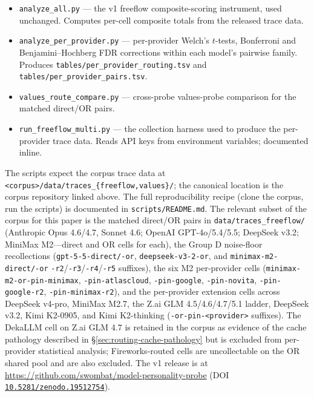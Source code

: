 \documentclass[11pt,a4paper]{article}
\begin{document}
\begin{itemize}[leftmargin=2em, itemsep=0.2em]
    \item \begin{sloppypar}\texttt{analyze\_all.py} --- the v1 freeflow composite-scoring instrument, used unchanged. Computes per-cell composite totals from the released trace data.\end{sloppypar}
    \item \begin{sloppypar}\texttt{analyze\_per\_provider.py} --- per-provider Welch's $t$-tests, Bonferroni and Benjamini--Hochberg FDR corrections within each model's pairwise family. Produces \texttt{tables/\allowbreak per\_provider\_routing.tsv} and \texttt{tables/\allowbreak per\_provider\_pairs.tsv}.\end{sloppypar}
    \item \begin{sloppypar}\texttt{values\_route\_compare.py} --- cross-probe values-probe comparison for the matched direct/OR pairs.\end{sloppypar}
    \item \begin{sloppypar}\texttt{run\_freeflow\_multi.py} --- the collection harness used to produce the per-provider trace data. Reads API keys from environment variables; documented inline.\end{sloppypar}
\end{itemize}

\begin{sloppypar}
\noindent The scripts expect the corpus trace data at \texttt{<corpus>/\allowbreak data/\allowbreak traces\_\{freeflow,values\}/}; the canonical location is the corpus repository linked above. The full reproducibility recipe (clone the corpus, run the scripts) is documented in \texttt{scripts/\allowbreak README.md}. The relevant subset of the corpus for this paper is the matched direct/OR pairs in \texttt{data/\allowbreak traces\_freeflow/} (Anthropic Opus 4.6/4.7, Sonnet 4.6; OpenAI GPT-4o/5.4/5.5; DeepSeek v3.2; MiniMax M2---direct and OR cells for each), the Group D noise-floor recollections (\texttt{gpt-5-5-\allowbreak direct/-or}, \texttt{deepseek-v3-2-or}, and \texttt{minimax-m2-\allowbreak direct/-or} \texttt{-r2}/\texttt{-r3}/\texttt{-r4}/\texttt{-r5} suffixes), the six M2 per-provider cells (\texttt{minimax-m2-\allowbreak or-pin-minimax}, \texttt{-pin-\allowbreak atlascloud}, \texttt{-pin-google}, \texttt{-pin-novita}, \texttt{-pin-google-r2}, \texttt{-pin-minimax-r2}), and the per-provider extension cells across DeepSeek v4-pro, MiniMax M2.7, the Z.ai GLM 4.5/4.6/4.7/5.1 ladder, DeepSeek v3.2, Kimi K2-0905, and Kimi K2-thinking (\texttt{-or-pin-<provider>} suffixes). The DekaLLM cell on Z.ai GLM 4.7 is retained in the corpus as evidence of the cache pathology described in \S\ref{sec:routing-cache-pathology} but is excluded from per-provider statistical analysis; Fireworks-routed cells are uncollectable on the OR shared pool and are also excluded. The v1 release is at \url{https://github.com/swombat/model-personality-probe} (DOI \href{https://doi.org/10.5281/zenodo.19512754}{\texttt{10.5281/\allowbreak zenodo.19512754}}).
\end{sloppypar}
\end{document}
